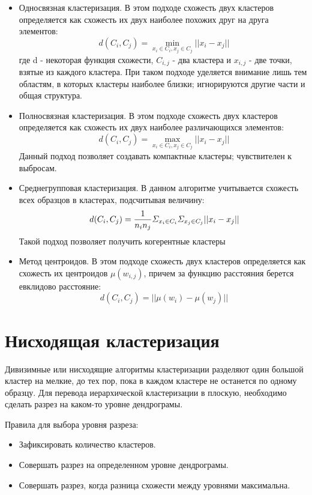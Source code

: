 \documentclass[12pt, a4paper]{article}
\begin{document}
\begin{itemize}
\item Односвязная кластеризация. В этом подходе схожесть двух кластеров определяется как схожесть их двух наиболее похожих друг на друга элементов:
\[
\ d(C_i, C_j) =  \min_{x_i \in C_i, x_j \in C_j} ||x_i - x_j||
\]
где d - некоторая функция схожести, $C_{i, j}$ - два кластера и $x_{i, j}$ - две точки, взятые из каждого кластера. При таком подходе уделяется внимание лишь тем областям, в которых кластеры наиболее близки; игнорируются другие части и общая структура.
\item Полносвязная кластеризация. В этом подходе схожесть двух кластеров определяется как схожесть их двух наиболее различающихся элементов:
\[
\ d(C_i, C_j) =  \max_{x_i \in C_i, x_j \in C_j} ||x_i - x_j||
\]
Данный подход позволяет создавать компактные кластеры; чувствителен к выбросам.
\item Среднегрупповая кластеризация. В данном алгоритме учитывается схожесть всех образцов в кластерах, подсчитывая величину:
\[
\ d(C_i, C_j) = \frac{1}{n_{i}n_{j}}{\mit\Sigma}_{x_i \in C_i}{\mit\Sigma}_{x_j \in C_j}||x_i - x_j||
\]
Такой подход позволяет получить когерентные кластеры
\item Метод центроидов. В этом подходе схожесть двух кластеров определяется как схожесть их центроидов $\mu(w_{i,j})$, причем за функцию расстояния берется евклидово расстояние:
\[
\ d(C_i, C_j) =||\mu(w_i)-\mu(w_j)||
\]
\end{itemize}

\section*{Нисходящая кластеризация}

Дивизимные или нисходящие алгоритмы кластеризации разделяют один большой кластер на мелкие, до тех пор, пока в каждом кластере не останется по одному образцу. Для перевода иерархической кластеризации в плоскую, необходимо сделать разрез на каком-то уровне дендрограмы. 

Правила для выбора уровня разреза:
\begin{itemize} 
\item Зафиксировать количество кластеров.


\item Совершать разрез на определенном уровне дендрограмы. 


\item Совершать разрез, когда разница схожести между уровнями максимальна. 
\end{itemize}
\end{document}
